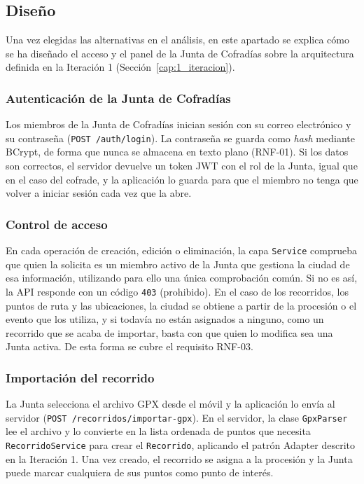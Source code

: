 \subsection{Diseño}

Una vez elegidas las alternativas en el análisis, en este apartado se explica cómo se ha diseñado el acceso y el panel de la Junta de Cofradías sobre la arquitectura definida en la Iteración 1 (Sección~\ref{cap:1_iteracion}).

\subsubsection{Autenticación de la Junta de Cofradías}

Los miembros de la Junta de Cofradías inician sesión con su correo electrónico y su contraseña (\texttt{POST /auth/login}). La contraseña se guarda como \emph{hash} mediante BCrypt, de forma que nunca se almacena en texto plano (RNF-01). Si los datos son correctos, el servidor devuelve un token JWT con el rol de la Junta, igual que en el caso del cofrade, y la aplicación lo guarda para que el miembro no tenga que volver a iniciar sesión cada vez que la abre.

\subsubsection{Control de acceso}

En cada operación de creación, edición o eliminación, la capa \texttt{Service} comprueba que quien la solicita es un miembro activo de la Junta que gestiona la ciudad de esa información, utilizando para ello una única comprobación común. Si no es así, la API responde con un código \texttt{403} (prohibido). En el caso de los recorridos, los puntos de ruta y las ubicaciones, la ciudad se obtiene a partir de la procesión o el evento que los utiliza, y si todavía no están asignados a ninguno, como un recorrido que se acaba de importar, basta con que quien lo modifica sea una Junta activa. De esta forma se cubre el requisito RNF-03.

\subsubsection{Importación del recorrido}

La Junta selecciona el archivo GPX desde el móvil y la aplicación lo envía al servidor (\texttt{POST /recorridos/importar-gpx}). En el servidor, la clase \texttt{GpxParser} lee el archivo y lo convierte en la lista ordenada de puntos que necesita \texttt{RecorridoService} para crear el \texttt{Recorrido}, aplicando el patrón Adapter descrito en la Iteración 1. Una vez creado, el recorrido se asigna a la procesión y la Junta puede marcar cualquiera de sus puntos como punto de interés.


